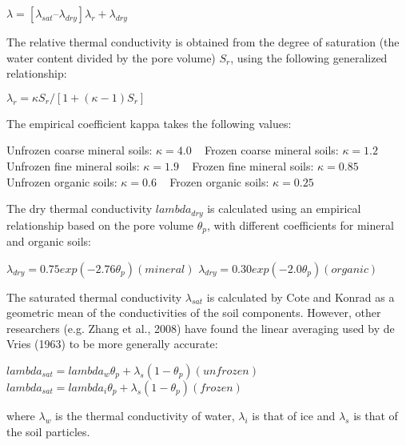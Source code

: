 $\lambda = [ \lambda_{sat} – \lambda_{dry} ] \lambda_r + \lambda_{dry}$

The relative thermal conductivity is obtained from the degree of saturation (the water content divided by the pore volume) $S_r$, using the following generalized relationship\+:

$\lambda_r = \kappa S_r/[1 + (\kappa-1) S_r ]$

The empirical coefficient kappa takes the following values\+:

Unfrozen coarse mineral soils\+: $\kappa = 4.0$ ~\newline
Frozen coarse mineral soils\+: $\kappa = 1.2$ ~\newline
Unfrozen fine mineral soils\+: $\kappa = 1.9$ ~\newline
Frozen fine mineral soils\+: $\kappa = 0.85$ ~\newline
Unfrozen organic soils\+: $\kappa = 0.6$ ~\newline
Frozen organic soils\+: $\kappa = 0.25$

The dry thermal conductivity $lambda_{dry}$ is calculated using an empirical relationship based on the pore volume $\theta_p$, with different coefficients for mineral and organic soils\+:

$\lambda_{dry} = 0.75 exp(-2.76 \theta_p) (mineral)$ $\lambda_{dry} = 0.30 exp(-2.0 \theta_p) (organic)$

The saturated thermal conductivity $\lambda_{sat}$ is calculated by Cote and Konrad as a geometric mean of the conductivities of the soil components. However, other researchers (e.\+g. Zhang et al., 2008) have found the linear averaging used by de Vries (1963) to be more generally accurate\+:

$lambda_{sat} = lambda_w \theta_p + \lambda_s (1 - \theta_p) (unfrozen)$ $lambda_{sat} = lambda_i \theta_p + \lambda_s (1 - \theta_p) (frozen)$

where $\lambda_w$ is the thermal conductivity of water, $\lambda_i$ is that of ice and $\lambda_s$ is that of the soil particles.


